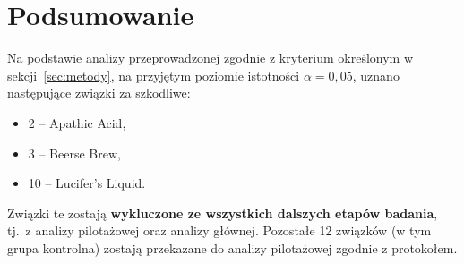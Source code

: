 \documentclass[12pt, a4paper]{article}
\begin{document}
\section{Podsumowanie}

Na podstawie analizy przeprowadzonej zgodnie z kryterium określonym w sekcji~\ref{sec:metody}, na przyjętym poziomie istotności $\alpha = 0{,}05$, uznano następujące związki za szkodliwe:

\begin{itemize}
    \item 2 -- Apathic Acid,
    \item 3 -- Beerse Brew,
    \item 10 -- Lucifer's Liquid.
\end{itemize}

Związki te zostają \textbf{wykluczone ze wszystkich dalszych etapów badania}, tj.\
z analizy pilotażowej oraz analizy głównej. Pozostałe 12 związków (w tym grupa kontrolna) zostają przekazane do analizy pilotażowej zgodnie z protokołem.
\end{document}
